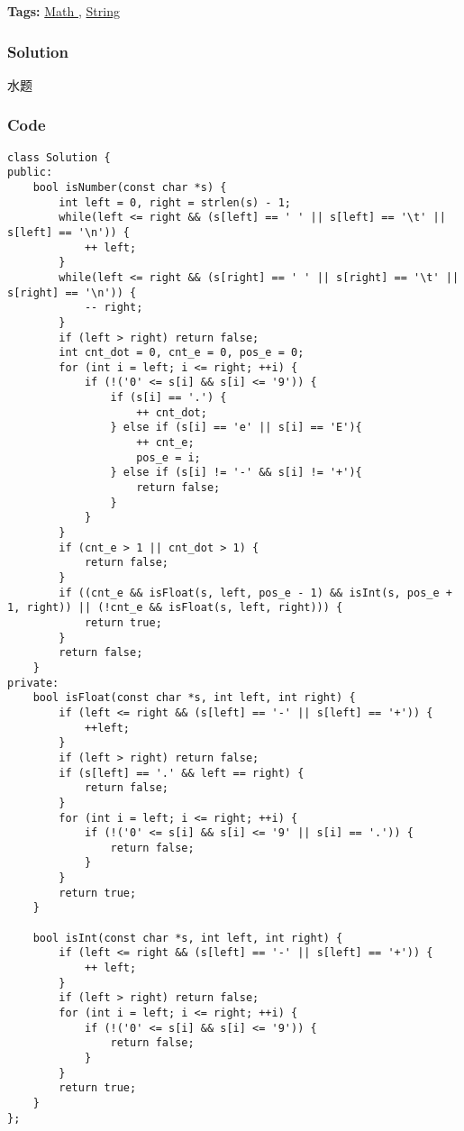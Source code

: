 \documentclass{article}
\begin{document}
\begin{CJK*}{UTF8}{gkai}
\textbf{Tags: }
\hyperref[ Math ]{ Math },  \hyperref[ String ]{ String }



\subsubsection*{Solution}
水题

\subsubsection*{Code}
\begin{lstlisting}
class Solution {
public:
    bool isNumber(const char *s) {
        int left = 0, right = strlen(s) - 1;
        while(left <= right && (s[left] == ' ' || s[left] == '\t' || s[left] == '\n')) {
            ++ left;
        }
        while(left <= right && (s[right] == ' ' || s[right] == '\t' || s[right] == '\n')) {
            -- right;
        }
        if (left > right) return false;
        int cnt_dot = 0, cnt_e = 0, pos_e = 0;
        for (int i = left; i <= right; ++i) {
            if (!('0' <= s[i] && s[i] <= '9')) {
                if (s[i] == '.') {
                    ++ cnt_dot;
                } else if (s[i] == 'e' || s[i] == 'E'){
                    ++ cnt_e;
                    pos_e = i;
                } else if (s[i] != '-' && s[i] != '+'){
                    return false;
                }
            }
        }
        if (cnt_e > 1 || cnt_dot > 1) {
            return false;
        }
        if ((cnt_e && isFloat(s, left, pos_e - 1) && isInt(s, pos_e + 1, right)) || (!cnt_e && isFloat(s, left, right))) {
            return true;
        }
        return false;
    }
private:
    bool isFloat(const char *s, int left, int right) {
        if (left <= right && (s[left] == '-' || s[left] == '+')) {
            ++left;
        }
        if (left > right) return false;
        if (s[left] == '.' && left == right) {
            return false;
        }
        for (int i = left; i <= right; ++i) {
            if (!('0' <= s[i] && s[i] <= '9' || s[i] == '.')) {
                return false;
            }
        }
        return true;
    }
    
    bool isInt(const char *s, int left, int right) {
        if (left <= right && (s[left] == '-' || s[left] == '+')) {
            ++ left;
        }
        if (left > right) return false;
        for (int i = left; i <= right; ++i) {
            if (!('0' <= s[i] && s[i] <= '9')) {
                return false;
            }
        }
        return true;
    }
};


\end{lstlisting}
\end{CJK*}
\end{document}
